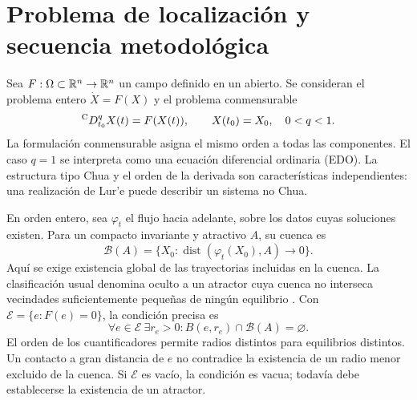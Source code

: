 \section{Problema de localización y secuencia metodológica}
\label{bre:fund:problema}

Sea $F:\Omega\subset\mathbb R^n\to\mathbb R^n$ un campo definido en un abierto.
Se consideran el problema entero $\dot X=F(X)$ y el problema conmensurable
\begin{equation}
 {}^{\mathrm C}D_{t_0}^{q} X(t)=F(X(t)),\qquad X(t_0)=X_0,
 \quad 0<q<1.
 \label{bre:fund:pvi}
\end{equation}
La formulación conmensurable asigna el mismo orden a todas las componentes.
El caso $q=1$ se interpreta como una ecuación diferencial ordinaria (EDO).
La estructura tipo Chua y el orden de la derivada son características
independientes: una realización de Lur'e puede describir un sistema no Chua.

En orden entero, sea $\varphi_t$ el flujo hacia adelante, sobre los datos
cuyas soluciones existen. Para un compacto invariante y atractivo $A$, su cuenca es
\begin{equation}
 \mathcal B(A)=\{X_0:\operatorname{dist}(\varphi_t(X_0),A)\to0\}.
 \label{bre:fund:cuenca}
\end{equation}
Aquí se exige existencia global de las trayectorias incluidas en la cuenca.
La clasificación usual denomina oculto a un atractor cuya cuenca no
interseca vecindades suficientemente pequeñas de ningún equilibrio
\cite{LeonovKuznetsov2013,DudkowskiEtAl2016}. Con
$\mathcal E=\{e:F(e)=0\}$, la condición precisa es
\begin{equation}
 \forall e\in\mathcal E\ \exists r_e>0:
 B(e,r_e)\cap\mathcal B(A)=\varnothing.
 \label{bre:fund:hidden}
\end{equation}
El orden de los cuantificadores permite radios distintos para equilibrios
distintos. Un contacto a gran distancia de $e$ no contradice la existencia
de un radio menor excluido de la cuenca. Si $\mathcal E$ es vacío, la
condición es vacua; todavía debe establecerse la existencia de un atractor.

